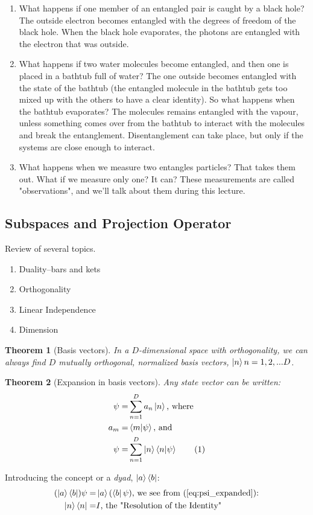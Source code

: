 \documentclass[]{article}
\newcommand\numberthis{\addtocounter{equation}{1}\tag{\theequation}}
\newtheorem{thm}{Theorem}
\begin{document}
\begin{enumerate}
	\item What happens if one member of an entangled pair is caught by a black hole? The outside electron becomes entangled with the degrees of freedom of the black hole. When the black hole evaporates, the photons are entangled with the electron that was outside.
	\item What happens if two water molecules become entangled, and then one is placed in a bathtub full of water? The one outside becomes entangled with the state of the bathtub (the entangled molecule in the bathtub gets too mixed up with the others to have a clear identity). So what happens when the bathtub evaporates? The molecules remains entangled with the vapour, unless something comes over from the bathtub to interact with the molecules and break the entanglement. Disentanglement can take place, but only if the systems are close enough to interact.
	\item What happens when we measure two entangles particles? That takes them out. What if we measure only one? It can? These measurements are called "observations", and we'll talk about them during this lecture.
\end{enumerate}

\subsection{Subspaces and Projection Operator}

Review of several topics.
\begin{enumerate}
	\item Duality--bars and kets
	\item Orthogonality
	\item Linear Independence
	\item Dimension
\end{enumerate}

\begin{thm}[Basis vectors]
	In a $D$-dimensional space with orthogonality, we can always find $D$ mutually orthogonal, normalized basis vectors, $\ket{n} n=1,2,...D$.
\end{thm}

\begin{thm}[Expansion in basis vectors]
	Any state vector can be written:
	\begin{align*}
		\psi =& \sum_{n=1}^{D} a_n \ket{n} \text{, where}\\
		a_m =& \braket{m\vert\psi} \text{, and}\\
		\psi =& \sum_{n=1}^{D} \ket{n} \braket{n\vert\psi} \numberthis \label{eq:psi_expanded}
	\end{align*}
\end{thm}
Introducing the concept or a \emph{dyad}, $\ket{a}\bra{b}$:
\begin{align*}
	(\ket{a}\bra{b})\psi =& \ket{a}(\bra{b}\psi) \text{, we see from (\ref{eq:psi_expanded}):}\\
	\ket{n}\bra{n} =& I \text{, the "Resolution of the Identity"}
\end{align*}
\end{document}
